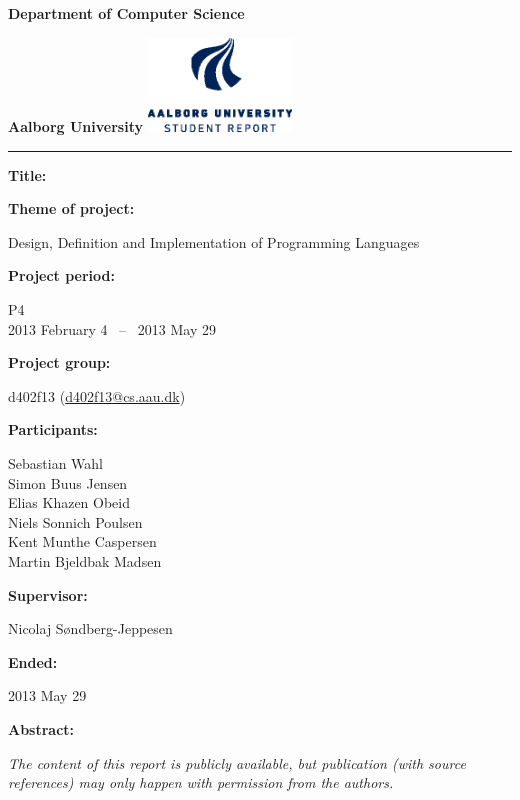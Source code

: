 \begin{nopagebreak}
  \begin{minipage}{\textwidth}
    \vspace{2cm}
\LARGE{\textbf{Department of Computer Science}}\vspace{-2.1cm}

\large{\textbf{Aalborg University}}
\hspace{8.30cm}\includegraphics[height=2.5cm]{pictures/aau_logo_en_blue.eps}
\end{minipage}
\vspace{0.1cm}
\hrule

\newcommand{\titleitem}[2]{\textbf{#1:}

\hspace*{0.5cm}
\begin{minipage}{0.9\columnwidth}#2\end{minipage}
\vspace{0.25cm}}
\begin{multicols}{2}

\titleitem{Title}{}

\titleitem{Theme of project}{Design, Definition and Implementation of Programming Languages}

\titleitem{Project period}{P4\\2013 February 4 ~--~ 2013 May 29}

\titleitem{Project group}{d402f13 (\url{d402f13@cs.aau.dk})}

\titleitem{Participants}{
    Sebastian Wahl\\
    Simon Buus Jensen\\
    Elias Khazen Obeid\\
    Niels Sonnich Poulsen\\
    Kent Munthe Caspersen\\
    Martin Bjeldbak Madsen
}

\titleitem{Supervisor}{Nicolaj Søndberg-Jeppesen}

\titleitem{Ended}{2013 May 29}

\vfill
\columnbreak

\titleitem{Abstract}{}

\end{multicols}
\centering
\textit{The content of this report is publicly available, but publication (with source references) may only happen with permission from the authors.}

\end{nopagebreak}
